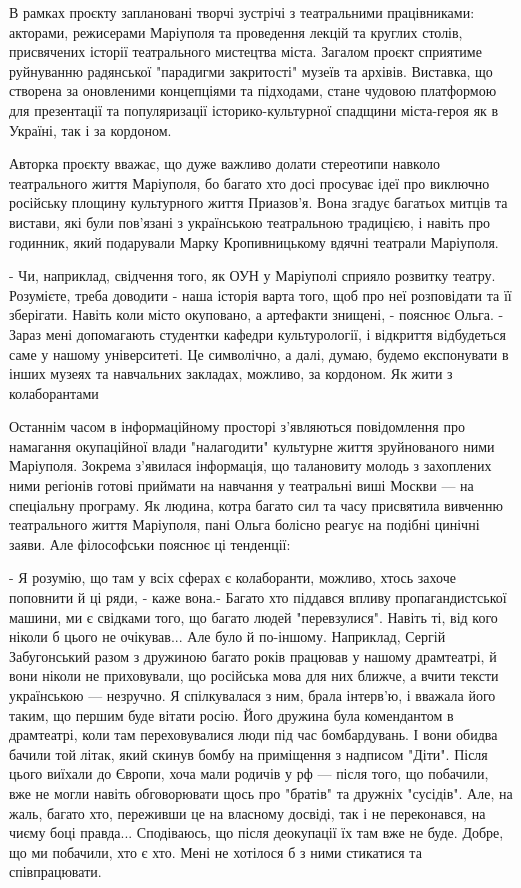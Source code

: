 В рамках проєкту заплановані творчі зустрічі з театральними працівниками:
акторами, режисерами Маріуполя та проведення лекцій та круглих столів,
присвячених історії театрального мистецтва міста. Загалом проєкт сприятиме
руйнуванню радянської "парадигми закритості" музеїв та архівів. Виставка, що
створена за оновленими концепціями та підходами, стане чудовою платформою для
презентації та популяризації історико-культурної спадщини міста-героя як в
Україні, так і за кордоном. 

Авторка проєкту вважає, що дуже важливо долати стереотипи навколо театрального
життя Маріуполя, бо багато хто досі просуває ідеї про виключно російську
площину культурного життя Приазов'я. Вона згадує багатьох митців та вистави,
які були пов'язані з українською театральною традицією, і навіть про годинник,
який подарували Марку Кропивницькому вдячні театрали Маріуполя. 

- Чи, наприклад, свідчення того, як ОУН у Маріуполі сприяло розвитку театру.
Розумієте, треба доводити - наша історія варта того, щоб про неї розповідати та
її зберігати. Навіть коли місто окуповано, а артефакти знищені, - пояснює
Ольга. - Зараз мені допомагають студентки кафедри культурології, і відкриття
відбудеться саме у нашому університеті. Це символічно, а далі, думаю, будемо
експонувати в інших музеях та навчальних закладах, можливо, за кордоном.  Як
жити з колаборантами

Останнім часом в інформаційному просторі з'являються повідомлення про намагання
окупаційної влади "налагодити" культурне життя зруйнованого ними Маріуполя.
Зокрема з'явилася інформація, що талановиту молодь з захоплених ними регіонів
готові приймати на навчання у театральні виші Москви — на спеціальну програму.
Як людина, котра багато сил та часу присвятила вивченню театрального життя
Маріуполя, пані Ольга болісно реагує на подібні цинічні заяви. Але філософськи
пояснює ці тенденції: 

- Я розумію, що там у всіх сферах є колаборанти, можливо, хтось захоче
поповнити й ці ряди, - каже вона.-  Багато хто піддався впливу
пропагандистської машини, ми є свідками того, що багато людей "перевзулися".
Навіть ті, від кого ніколи б цього не очікував... Але було й по-іншому.
Наприклад, Сергій Забугонський разом з дружиною багато років працював у нашому
драмтеатрі, й вони ніколи не приховували, що російська мова для них ближче, а
вчити тексти українською — незручно. Я спілкувалася з ним, брала інтерв'ю, і
вважала його таким, що першим буде вітати росію. Його дружина була комендантом
в драмтеатрі, коли там переховувалися люди під час бомбардувань. І вони обидва
бачили той літак, який скинув бомбу на приміщення з надписом "Діти". Після
цього виїхали до Європи, хоча мали родичів у рф — після того, що побачили, вже
не могли навіть обговорювати щось про "братів" та дружніх "сусідів". Але, на
жаль, багато хто, переживши це на власному досвіді, так і не переконався, на
чиєму боці правда... Сподіваюсь, що після деокупації їх там вже не буде. Добре,
що ми побачили, хто є хто. Мені не хотілося б з ними стикатися та
співпрацювати. 

